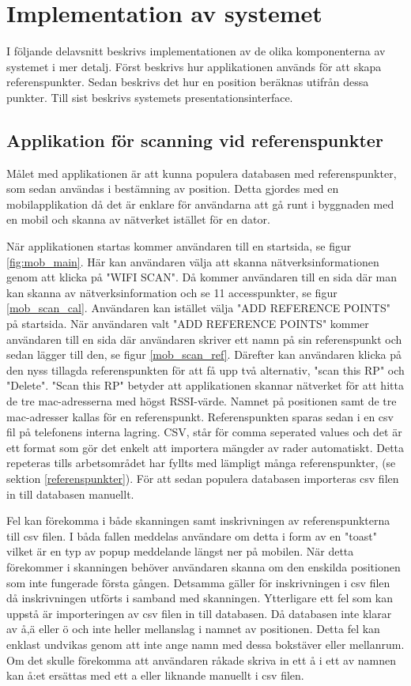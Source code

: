 \documentclass[swedish, a4paper,12pt]{article}
\begin{document}
\section{Implementation av systemet}
I följande delavsnitt beskrivs implementationen av de olika komponenterna av systemet i mer detalj. Först beskrivs hur applikationen används för att skapa referenspunkter. Sedan beskrivs det hur en position beräknas utifrån dessa punkter. Till sist beskrivs systemets presentationsinterface.

\subsection{Applikation för scanning vid referenspunkter}
Målet med applikationen är att kunna populera databasen med referenspunkter, som sedan användas i bestämning av position. Detta gjordes med en mobilapplikation då det är enklare för användarna att gå runt i byggnaden med en mobil och skanna av nätverket istället för en dator.

När applikationen startas kommer användaren till en startsida, se figur \ref{fig:mob_main}. Här kan användaren välja att skanna nätverksinformationen genom att klicka på "WIFI SCAN". Då kommer användaren till en sida där man kan skanna av nätverksinformation och se 11 accesspunkter, se figur \ref{mob_scan_cal}. Användaren kan istället välja "ADD REFERENCE POINTS" på startsida. När användaren valt "ADD REFERENCE POINTS" kommer användaren till en sida där användaren skriver ett namn på sin referenspunkt och sedan lägger till den, se figur \ref{mob_scan_ref}. Därefter kan användaren klicka på den nyss tillagda referenspunkten för att få upp två alternativ, "scan this RP" och "Delete". "Scan this RP" betyder att applikationen skannar nätverket för att hitta de tre mac-adresserna med högst RSSI-värde. Namnet på positionen samt de tre mac-adresser kallas för en referenspunkt. Referenspunkten sparas sedan i en csv fil på telefonens interna lagring. CSV, står för comma seperated values och det är ett format som gör det enkelt att importera mängder av rader automatiskt. Detta repeteras tills arbetsområdet har fyllts med lämpligt många referenspunkter, (se sektion \ref{referenspunkter}). För att sedan populera databasen importeras csv filen in till databasen manuellt.

Fel kan förekomma i både skanningen samt inskrivningen av referenspunkterna till csv filen. I båda fallen meddelas användare om detta i form av en "toast" vilket är en typ av popup meddelande längst ner på mobilen. När detta förekommer i skanningen behöver användaren skanna om den enskilda positionen som inte fungerade första gången. Detsamma gäller för inskrivningen i csv filen då inskrivningen utförts i samband med skanningen. Ytterligare ett fel som kan uppstå är importeringen av csv filen in till databasen. Då databasen inte klarar av å,ä eller ö och inte heller mellanslag i namnet av positionen. Detta fel kan enklast undvikas genom att inte ange namn med dessa bokstäver eller mellanrum. Om det skulle förekomma att användaren råkade skriva in ett å i ett av namnen kan å:et ersättas med ett a eller liknande manuellt i csv filen.%
\end{document}
